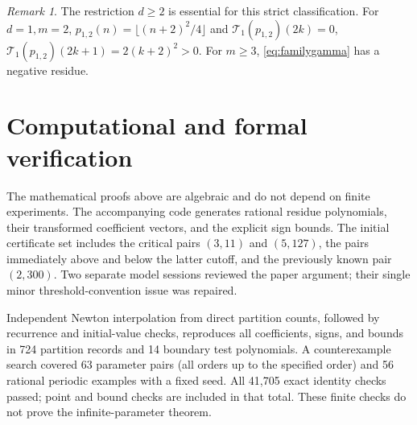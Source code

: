 \documentclass[11pt,reqno]{amsart}
\theoremstyle{remark}
\newtheorem{remark}[theorem]{Remark}
\newcommand{\Lag}{\mathcal{T}}
\begin{document}
\begin{remark}
The restriction \(d\ge2\) is essential for this strict classification.
For \(d=1,m=2\),
\(p_{1,2}(n)=\lfloor(n+2)^2/4\rfloor\) and
\(\Lag_1(p_{1,2})(2k)=0\),
\(\Lag_1(p_{1,2})(2k+1)=2(k+2)^2>0\).
For \(m\ge3\), \eqref{eq:familygamma} has a negative residue.
\end{remark}

\section{Computational and formal verification}

The mathematical proofs above are algebraic and do not depend on finite
experiments. The accompanying code generates rational residue polynomials,
their transformed coefficient vectors, and the explicit sign bounds.
The initial certificate set includes the critical pairs \((3,11)\) and
\((5,127)\), the pairs immediately above and below the latter cutoff,
and the previously known pair \((2,300)\).
Two separate model sessions reviewed the paper argument; their single
minor threshold-convention issue was repaired.

Independent Newton interpolation from direct partition counts, followed by
recurrence and initial-value checks, reproduces all coefficients, signs,
and bounds in 724 partition records and 14 boundary test polynomials.
A counterexample search covered 63 parameter pairs (all orders up to the
specified order) and 56 rational periodic examples with a fixed seed.
All 41,705 exact identity checks passed; point and bound checks are included
in that total. These finite checks do not prove the infinite-parameter theorem.
\end{document}
